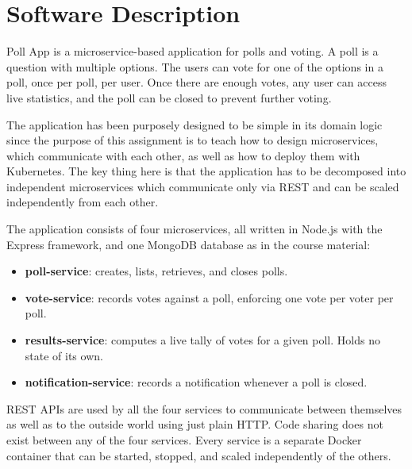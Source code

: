 \section{Software Description}

Poll App is a microservice-based application for polls and voting. A poll is a question with multiple options. The users can vote for one of the options in a poll, once per poll, per user. Once there are enough votes, any user can access live statistics, and the poll can be closed to prevent further voting.

The application has been purposely designed to be simple in its domain logic since the purpose of this assignment is to teach how to design microservices, which communicate with each other, as well as how to deploy them with Kubernetes. The key thing here is that the application has to be decomposed into independent microservices which communicate only via REST and can be scaled independently from each other.

The application consists of four microservices, all written in Node.js
with the Express framework, and one MongoDB database as in the course material:

\begin{itemize}
    \item \textbf{poll-service}: creates, lists, retrieves, and closes polls.
    \item \textbf{vote-service}: records votes against a poll, enforcing one
        vote per voter per poll.
    \item \textbf{results-service}: computes a live tally of votes for a
        given poll. Holds no state of its own.
    \item \textbf{notification-service}: records a notification whenever a
        poll is closed.
\end{itemize}

REST APIs are used by all the four services to communicate between themselves as well as to the outside world using just plain HTTP. Code sharing does not exist between any of the four services. Every service is a separate Docker container that can be started, stopped, and scaled independently of the others.
